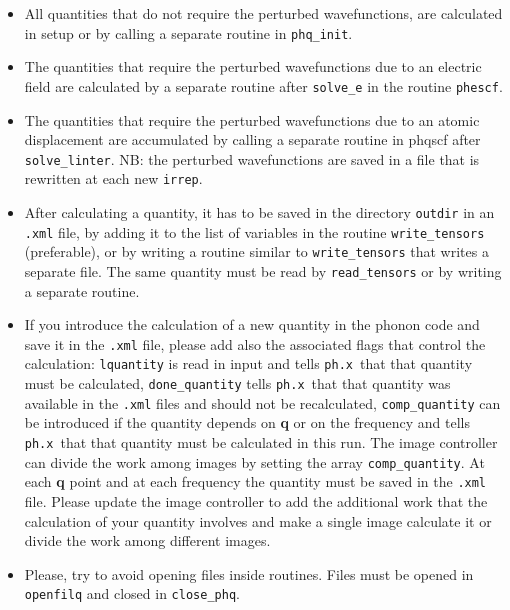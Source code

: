 \documentclass[12pt,a4paper]{article}
\def\phx{\texttt{ph.x}}
\begin{document}
\begin{itemize}

\item
All quantities that do not require the perturbed wavefunctions, are
calculated in setup or by calling a separate routine in \texttt{phq\_init}. 

\item
The quantities that require the perturbed wavefunctions due to an
electric field are calculated by a separate routine after 
\texttt{solve\_e} in the routine \texttt{phescf}.

\item
The quantities that require the perturbed wavefunctions due to an
atomic displacement are accumulated by calling a separate routine
in phqscf after \texttt{solve\_linter}. 
NB: the perturbed wavefunctions are saved in a file that is rewritten at
each new \texttt{irrep}.

\item
After calculating a quantity, it has to be saved in the directory
\texttt{outdir} in an \texttt{.xml} file, by adding it to the list 
of variables in the routine \texttt{write\_tensors}  
(preferable), or by writing a routine similar to \texttt{write\_tensors} 
that writes a separate file. The same quantity must be read by 
\texttt{read\_tensors} or by writing a separate routine.

\item
If you introduce the calculation of a new quantity in the phonon code 
and save it in the \texttt{.xml} file, please add also the associated flags 
that control the calculation: 
\texttt{lquantity} is read in input and tells \phx\ that that quantity must be 
calculated, \texttt{done\_quantity} tells \phx\ that that quantity 
was available in the \texttt{.xml} files and should not be recalculated, 
\texttt{comp\_quantity} can be introduced if the quantity depends on 
{\bf q} or on the frequency and tells \phx\ that that quantity must be 
calculated in this run. The image controller can divide the work among images
by setting the array \texttt{comp\_quantity}. At each {\bf q} point and 
at each frequency the quantity must be saved in the \texttt{.xml} file.
Please update the image controller to add the additional work that the 
calculation of your quantity involves and make a single image calculate it 
or divide the work among different images.

\item
Please, try to avoid opening files inside routines.
Files must be opened in \texttt{openfilq} and closed in \texttt{close\_phq}.


\end{itemize}
\end{document}
